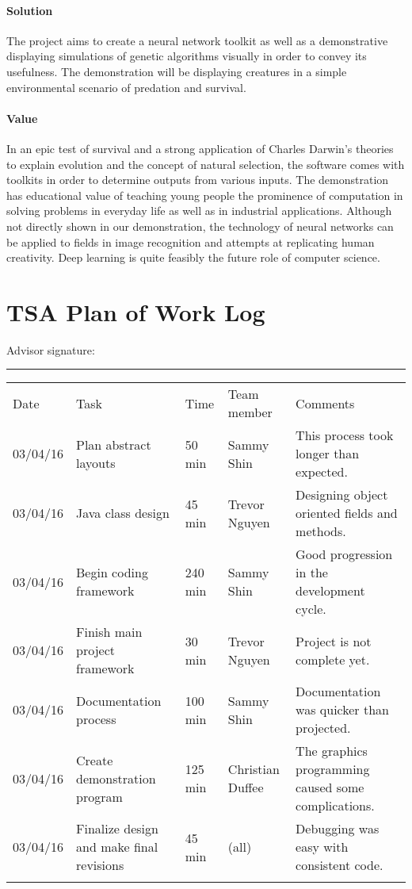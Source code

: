 \documentclass[letterpaper, 10pt]{article}
\begin{document}
	\paragraph{Solution} The project aims to create a neural network toolkit as well as a demonstrative displaying simulations of genetic algorithms visually in order to convey its usefulness. The demonstration will be displaying creatures in a simple environmental scenario of predation and survival.
	\paragraph{Value} In an epic test of survival and a strong application of Charles Darwin's theories to explain evolution and the concept of natural selection, the software comes with toolkits in order to determine outputs from various inputs. The demonstration has educational value of teaching young people the prominence of computation in solving problems in everyday life as well as in industrial applications. Although not directly shown in our demonstration, the technology of neural networks can be applied to fields in image recognition and attempts at replicating human creativity. Deep learning is quite feasibly the future role of computer science.
\cleardoublepage
\section{TSA Plan of Work Log}
	
	Advisor signature:
	\rule{10cm}{0.4pt}
	\footnotesize
	\begin{center}
	\begin{tabular} { l || p{1.25 in}| l| l|p{2.75in}}
		Date & Task & Time & Team member & Comments \\
		03/04/16 & Plan abstract layouts & 50 min & Sammy Shin & This process took longer than expected. \\
		03/04/16 & Java class design & 45 min & Trevor Nguyen & Designing object oriented fields and methods.\\
		03/04/16 & Begin coding framework & 240 min & Sammy Shin & Good progression in the development cycle.\\
		03/04/16 & Finish main project framework & 30 min & Trevor Nguyen & Project is not complete yet.\\
		03/04/16 & Documentation process & 100 min & Sammy Shin & Documentation was quicker than projected.\\
		03/04/16 & Create demonstration program & 125 min & Christian Duffee & The graphics programming caused some complications.\\
		03/04/16 & Finalize design and make final revisions & 45 min & (all) & Debugging was easy with consistent code.\\
		
	\normalsize
	\end{tabular}
	\end{center}
\cleardoublepage
\end{document}
